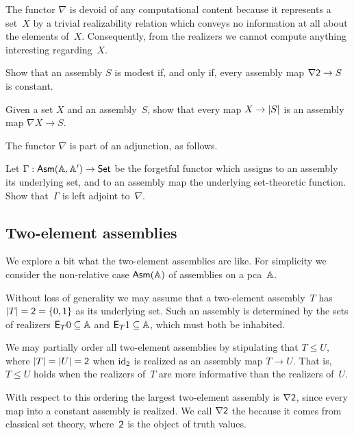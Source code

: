 The functor $\nabla$ is devoid of any computational content because it
represents a set~$X$ by a trivial realizability relation which conveys
no information at all about the elements of~$X$. Consequently, from
the realizers we cannot compute anything interesting regarding~$X$.

\begin{exercise}
  Show that an assembly $S$ is modest if, and only if, every assembly map $\nabla \two \to S$ is constant.
\end{exercise}

\begin{exercise}
  Given a set $X$ and an assembly~$S$, show that every map $X \to \S{S}$ is an assembly map $\nabla X \to S$.
\end{exercise}

The functor $\nabla$ is part of an adjunction, as follows.

\begin{exercise}
  Let $\Gamma : \AsmA \to \Set$ be the forgetful functor which assigns to an assembly its underlying set, and to an
  assembly map the underlying set-theoretic function. Show that~$\Gamma$ is left adjoint to~$\nabla$.
\end{exercise}


\subsection{Two-element assemblies}
\label{sec:two-elem-asm}

We explore a bit what the two-element assemblies are like. For simplicity we consider the non-relative case $\Asm{\AA}$ of assemblies on a pca~$\AA$.

Without loss of generality we may assume that a two-element assembly~$T$ has $\S{T} = \two = \{0, 1\}$ as its underlying set. Such an assembly is determined by the sets of realizers $\Ex{T} 0 \subseteq \AA$ and $\Ex{T} 1 \subseteq \AA$, which must both be inhabited.

We may partially order all two-element assemblies by stipulating that $T \leq U$, where $\S{T} = \S{U} = \two$ when $\id[\two]$ is realized as an assembly map $T \to U$.
That is, $T \leq U$ holds when the realizers of~$T$ are more informative than the realizers of~$U$.

With respect to this ordering the largest two-element assembly is $\nabla \two$, since every map into a constant assembly is realized. We call $\nabla \two$ the  because it comes from classical set theory, where~$\two$ is the object of truth values.

